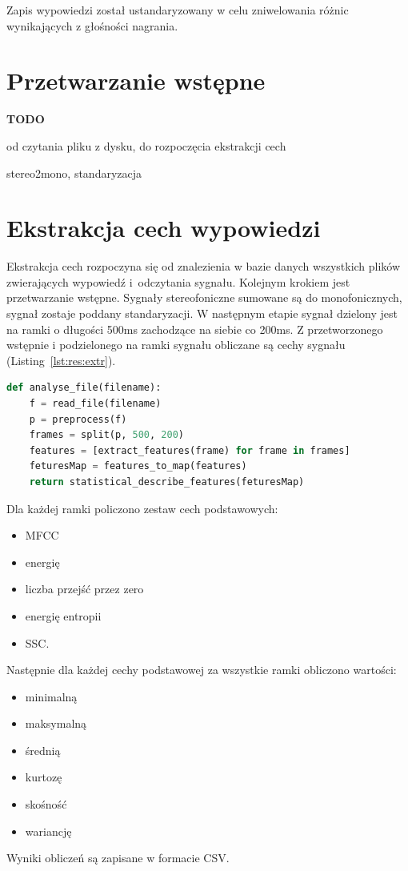 \documentclass[a4paper,12pt,twoside,openany]{report}
\newcommand{\TODO}{\textbf{TODO}}
\newcommand*\NewPage{\newpage\null\thispagestyle{empty}\newpage}
\newcommand{\Lst}[1]{(Listing~\ref{#1})}
\begin{document}
Zapis wypowiedzi został ustandaryzowany w celu zniwelowania różnic wynikających z głośności nagrania.
\section{Przetwarzanie wstępne}
\TODO{
	od czytania pliku z dysku, do rozpoczęcia ekstrakcji cech

	stereo2mono, standaryzacja
}
\NewPage
\section{Ekstrakcja cech wypowiedzi}
Ekstrakcja cech rozpoczyna się od znalezienia w bazie danych wszystkich plików zwierających wypowiedź i~odczytania sygnału. 
Kolejnym krokiem jest przetwarzanie wstępne. 
Sygnały stereofoniczne sumowane są do monofonicznych, sygnał zostaje poddany standaryzacji.
W następnym etapie sygnał dzielony jest na ramki o długości 500ms zachodzące na siebie co 200ms.
Z przetworzonego wstępnie i podzielonego na ramki sygnału obliczane są cechy sygnału \Lst{lst:res:extr}.
\begin{lstlisting}[language=Python,label={lst:res:extr},caption={funkcja obliczająca cechy sygnału pojedynczego pliku}]
def analyse_file(filename):
    f = read_file(filename)
    p = preprocess(f)
    frames = split(p, 500, 200)
    features = [extract_features(frame) for frame in frames]
    feturesMap = features_to_map(features)
    return statistical_describe_features(feturesMap)
\end{lstlisting}
Dla każdej ramki policzono zestaw cech podstawowych: 
\begin{itemize}
	\item MFCC
	\item energię
	\item liczba przejść przez zero
	\item energię entropii
	\item SSC.
\end{itemize}
Następnie dla każdej cechy podstawowej za wszystkie ramki obliczono wartości:
\begin{itemize}
	\item minimalną
	\item maksymalną
	\item średnią
	\item kurtozę
	\item skośność
	\item wariancję
\end{itemize}
Wyniki obliczeń są zapisane w formacie CSV.
\end{document}
